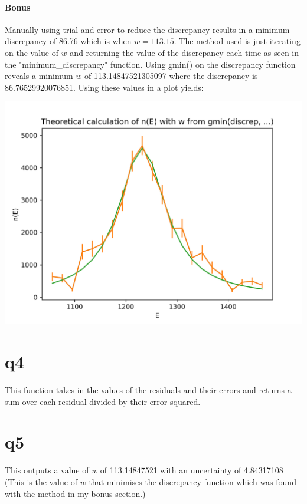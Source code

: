 \documentclass[a4paper,english]{article}
\begin{document}
    \paragraph{Bonus}
        \hfill \break
        
        Manually using trial and error to reduce the discrepancy results in a minimum discrepancy of 86.76
        which is when $w = 113.15$. The method used is just iterating on the 
        value of $w$ and returning the value of the discrepancy each time as seen in the "minimum\_discrepancy" function.
        \newline Using gmin() on the discrepancy function reveals a minimum $w$ of 
        113.14847521305097 where the discrepancy is 86.76529920076851.
        Using these values in a plot yields:
        \begin{center}
        \includegraphics[scale=0.8]{./2_5.png}
        \end{center}
    \section{q4}
        
        This function takes in the values of the residuals and their errors and 
        returns a sum over each residual divided by their error squared.
    \section{q5}
        
        This outputs a value of $w$ of 113.14847521 with an uncertainty of 4.84317108
        (This is the value of $w$ that minimises the discrepancy function which was found with the method
        in my bonus section.)
\end{document}
